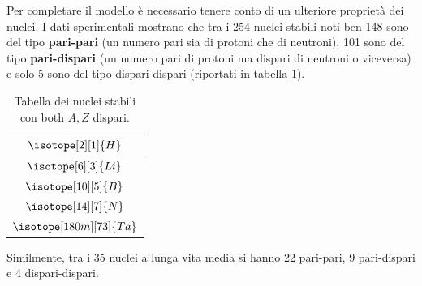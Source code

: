 Per completare il modello è necessario tenere conto di un ulteriore
proprietà dei nuclei.
I dati sperimentali mostrano che tra i 254 nuclei
stabili noti ben 148 sono del tipo \textbf{pari-pari} (un numero pari
sia di protoni che di neutroni), 101 sono del tipo \textbf{pari-dispari}
(un numero pari di protoni ma dispari di neutroni o viceversa) e solo 5
sono del tipo dispari-dispari (riportati in tabella \ref{tab:odd-odd-stable-nuclei}).
\begin{table}
	\centering
	\begin{tabular}{|c|}
		\hline
		$\isotope[2][1]{\mathlarger{H}}$ \\ \hline
		$\isotope[6][3]{\mathlarger{Li}}$ \\ \hline
		$\isotope[10][5]{\mathlarger{B}}$ \\ \hline
		$\isotope[14][7]{\mathlarger{N}}$ \\ \hline
		$\isotope[180m][73]{\mathlarger{Ta}}$ \\ \hline
	\end{tabular}
	\caption{Tabella dei nuclei stabili con both $ A,Z$ dispari.}
	\label{tab:odd-odd-stable-nuclei}
\end{table}

Similmente, tra i 35 nuclei a lunga vita media si hanno 22 pari-pari, 9 pari-dispari e 4
dispari-dispari.

